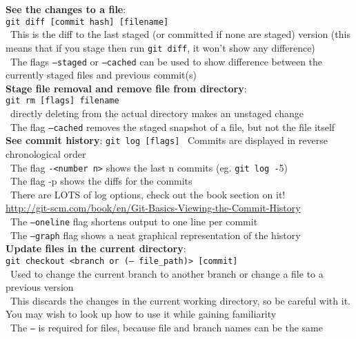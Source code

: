 \documentclass[12pt]{article}
\begin{document}
{{\bf See the changes to a file}:\\
\texttt{git diff [commit hash] [filename]}\\
\textbullet\, This is the diff to the last staged (or committed if none are staged) version (this means that if you stage then run \texttt{git diff}, it won't show any difference)\\
\textbullet\, The flags \texttt{--staged} or \texttt{--cached} can be used to show difference between the currently staged files and previous commit(s)\\

{\bf Stage file removal and remove file from directory}:\\
\texttt{git rm [flags] filename}\\
\textbullet\, directly deleting from the actual directory makes an unstaged change\\
\textbullet\, The flag \texttt{--cached} removes the staged snapshot of a file, but not the file itself\\

{\bf See commit history}:
\texttt{git log [flags]}
\textbullet\, Commits are displayed in reverse chronological order\\
\textbullet\, The flag \texttt{-<number n>} shows the last n commits (eg. \texttt{git log -}5)\\
\textbullet\, The flag -p shows the diffs for the commits\\
\textbullet\, There are LOTS of log options, check out the book section on it!\\ \url{http://git-scm.com/book/en/Git-Basics-Viewing-the-Commit-History}\\
\textbullet\, The \texttt{--oneline} flag shortens output to one line per commit\\
\textbullet\, The \texttt{--graph} flag shows a neat graphical representation of the history\\

{\bf Update files in the current directory}:\\
\texttt{git checkout <branch or (-- file{\_}path)> [commit]}\\
\textbullet\, Used to change the current branch to another branch or change a file to a previous version\\
\textbullet\, This discards the changes in the current working directory, so be careful with it. You may wish to look up how to use it while gaining familiarity\\
\textbullet\, The \texttt{--} is required for files, because file and branch names can be the same\\
    
}
\end{document}
